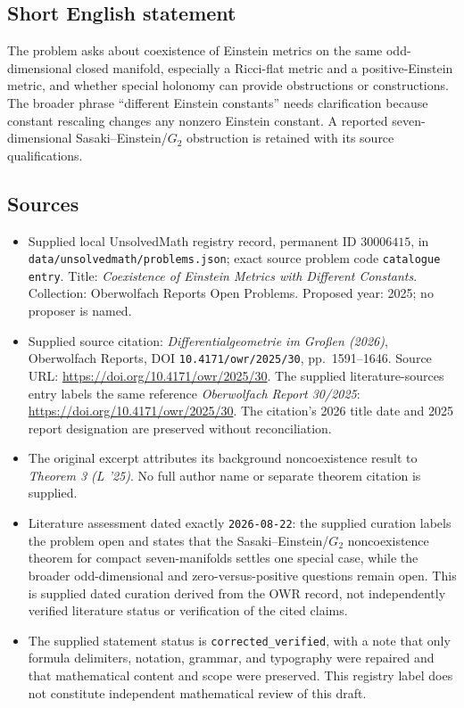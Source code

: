 \documentclass[11pt]{article}
\begin{document}
\subsection{Short English statement}
The problem asks about coexistence of Einstein metrics on the same odd-dimensional closed manifold, especially a Ricci-flat metric and a positive-Einstein metric, and whether special holonomy can provide obstructions or constructions. The broader phrase ``different Einstein constants'' needs clarification because constant rescaling changes any nonzero Einstein constant. A reported seven-dimensional Sasaki--Einstein/\(G_2\) obstruction is retained with its source qualifications.
\subsection{Sources}
\begin{itemize}
\item Supplied local UnsolvedMath registry record, permanent ID \(30006415\), in \texttt{data/unsolvedmath/problems.json}; exact source problem code \texttt{catalogue entry}. Title: \emph{Coexistence of Einstein Metrics with Different Constants}. Collection: Oberwolfach Reports Open Problems. Proposed year: 2025; no proposer is named.
\item Supplied source citation: \emph{Differentialgeometrie im Großen (2026)}, Oberwolfach Reports, DOI \texttt{10.4171/owr/2025/30}, pp.\ 1591--1646. Source URL: \url{https://doi.org/10.4171/owr/2025/30}. The supplied literature-sources entry labels the same reference \emph{Oberwolfach Report 30/2025}: \url{https://doi.org/10.4171/owr/2025/30}. The citation's 2026 title date and 2025 report designation are preserved without reconciliation.
\item The original excerpt attributes its background noncoexistence result to \emph{Theorem 3 (L '25)}. No full author name or separate theorem citation is supplied.
\item Literature assessment dated exactly \texttt{2026-08-22}: the supplied curation labels the problem open and states that the Sasaki--Einstein/\(G_2\) noncoexistence theorem for compact seven-manifolds settles one special case, while the broader odd-dimensional and zero-versus-positive questions remain open. This is supplied dated curation derived from the OWR record, not independently verified literature status or verification of the cited claims.
\item The supplied statement status is \texttt{corrected\_verified}, with a note that only formula delimiters, notation, grammar, and typography were repaired and that mathematical content and scope were preserved. This registry label does not constitute independent mathematical review of this draft.
\end{itemize}
\end{document}
